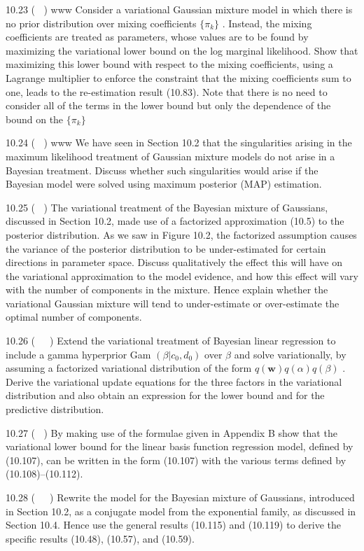 \documentclass[
  10
]{article}
\begin{document}
10.23 ( ) www Consider a variational Gaussian mixture model in which
there is no prior distribution over mixing coefficients
\(\{ \pi _ { k } \}\) . Instead, the mixing coefficients are treated as
parameters, whose values are to be found by maximizing the variational
lower bound on the log marginal likelihood. Show that maximizing this
lower bound with respect to the mixing coefficients, using a Lagrange
multiplier to enforce the constraint that the mixing coefficients sum to
one, leads to the re-estimation result (10.83). Note that there is no
need to consider all of the terms in the lower bound but only the
dependence of the bound on the \(\{ \pi _ { k } \}\)

10.24 ( ) www We have seen in Section 10.2 that the singularities
arising in the maximum likelihood treatment of Gaussian mixture models
do not arise in a Bayesian treatment. Discuss whether such singularities
would arise if the Bayesian model were solved using maximum posterior
(MAP) estimation.

10.25 ( ) The variational treatment of the Bayesian mixture of
Gaussians, discussed in Section 10.2, made use of a factorized
approximation (10.5) to the posterior distribution. As we saw in Figure
10.2, the factorized assumption causes the variance of the posterior
distribution to be under-estimated for certain directions in parameter
space. Discuss qualitatively the effect this will have on the
variational approximation to the model evidence, and how this effect
will vary with the number of components in the mixture. Hence explain
whether the variational Gaussian mixture will tend to under-estimate or
over-estimate the optimal number of components.

10.26 (  ) Extend the variational treatment of Bayesian linear
regression to include a gamma hyperprior Gam
\(( \beta | c _ { 0 } , d _ { 0 } )\) over \(\beta\) and solve
variationally, by assuming a factorized variational distribution of the
form \(q ( \mathbf { w } ) q ( \alpha ) q ( \beta )\) . Derive the
variational update equations for the three factors in the variational
distribution and also obtain an expression for the lower bound and for
the predictive distribution.

10.27 ( ) By making use of the formulae given in Appendix B show that
the variational lower bound for the linear basis function regression
model, defined by (10.107), can be written in the form (10.107) with the
various terms defined by (10.108)--(10.112).

10.28 (  ) Rewrite the model for the Bayesian mixture of Gaussians,
introduced in Section 10.2, as a conjugate model from the exponential
family, as discussed in Section 10.4. Hence use the general results
(10.115) and (10.119) to derive the specific results (10.48), (10.57),
and (10.59).
\end{document}
